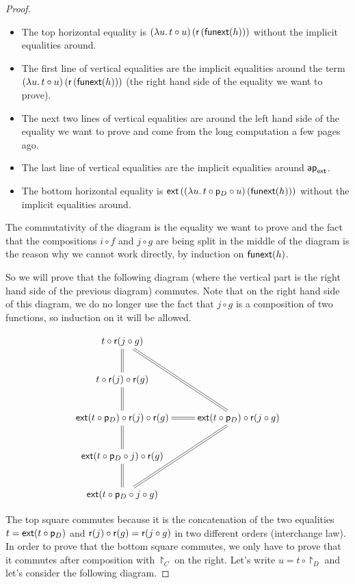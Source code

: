 \begin{proof}
  \begin{itemize}
  \item The top horizontal equality is
    ${(\lambda{}u.\,t\circ{}u)}\left({{\mathsf{r}}\left({\mathsf{funext}(h)}\right)}\right)$ without the
    implicit equalities around.
  \item The first line of vertical equalities are the implicit equalities around
    the term ${(\lambda{}u.\,t\circ{}u)}\left({{\mathsf{r}}\left({\mathsf{funext}(h)}\right)}\right)$ (the
    right hand side of the equality we want to prove).
  \item The next two lines of vertical equalities are around the left hand side
    of the equality we want to prove and come from the long computation a few
    pages ago.
  \item The last line of vertical equalities are the implicit equalities around
    $\mathsf{ap}_{\mathsf{ext}}$.
  \item The bottom horizontal equality is
    ${\mathsf{ext}}\left({{(\lambda{}u.\,t\circ\mathsf{p}_D\circ{}u)}\left({\mathsf{funext}(h)}\right)}\right)$
    without the implicit equalities around.
  \end{itemize}

  The commutativity of the diagram is the equality we want to prove and
  the fact that the compositions $i\circ f$ and $j\circ g$ are being split in
  the middle of the diagram is the reason why we cannot work directly, by induction on
  $\mathsf{funext}(h)$.

  So we will prove that the following diagram (where the vertical part is the
  right hand side of the previous diagram) commutes. Note that on the right hand
  side of this diagram, we do no longer use the fact that $j\circ g$ is a
  composition of two functions, so induction on it will be allowed.

  \[\xymatrix{
    t\circ\reflect(j\circ g) \ar@{=}[d] & \\
    t\circ\reflect(j)\circ\reflect(g) \ar@{=}[d] & \\
    \extend{t\circ\project_D}\circ\reflect(j)\circ\reflect(g) \ar@{=}[d] &
    \extend{t\circ\project_D}\circ\reflect(j\circ g) \ar@{=}[l] \ar@{=}[luu]
    \ar@{=}[ldd] \\
    \extend{t\circ\project_D\circ j}\circ\reflect(g) \ar@{=}[d] & \\
    \extend{t\circ\project_D\circ j\circ g} & \\
  }\]

  The top square commutes because it is the concatenation of the two equalities
  $t=\mathsf{ext}(t\circ\mathsf{p}_D)$ and $\mathsf{r}(j)\circ\mathsf{r}(g)=\mathsf{r}(j\circ
  g)$ in two different orders (interchange law). In order to prove that the
  bottom square commutes, we only have to prove that it commutes after
  composition with $\project_C$ on the right. Let's write $u=t\circ\project_D$
  and let's consider the following diagram.


\end{proof}
